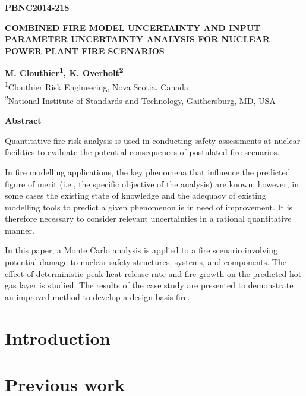\documentclass[12pt]{article}
\begin{document}
\begin{flushright}
\textbf{PBNC2014-218}
\end{flushright}

\begin{center}
\textbf{COMBINED FIRE MODEL UNCERTAINTY AND INPUT PARAMETER UNCERTAINTY ANALYSIS FOR NUCLEAR POWER PLANT FIRE SCENARIOS}
\end{center}

\begin{center}
\textbf{M. Clouthier\textsuperscript{1}, K. Overholt\textsuperscript{2}}\\

\textsuperscript{1}Clouthier Risk Engineering, Nova Scotia, Canada\\
\textsuperscript{2}National Institute of Standards and Technology, Gaithersburg, MD, USA
\end{center}

\begin{center}
\textbf{Abstract}
\end{center}

Quantitative fire risk analysis is used in conducting safety assessments at nuclear facilities to evaluate the potential consequences of postulated fire scenarios.

In fire modelling applications, the key phenomena that influence the predicted figure of merit (i.e., the specific objective of the analysis) are known; however, in some cases the existing state of knowledge and the adequacy of existing modelling tools to predict a given phenomenon is in need of improvement. It is therefore necessary to consider relevant uncertainties in a rational quantitative manner.

In this paper, a Monte Carlo analysis is applied to a fire scenario involving potential damage to nuclear safety structures, systems, and components. The effect of deterministic peak heat release rate and fire growth on the predicted hot gas layer is studied. The results of the case study are presented to demonstrate an improved method to develop a design basis fire.

\section{Introduction}
\label{sec:introduction}


\section{Previous work}
\label{sec:previous_work}
\end{document}
